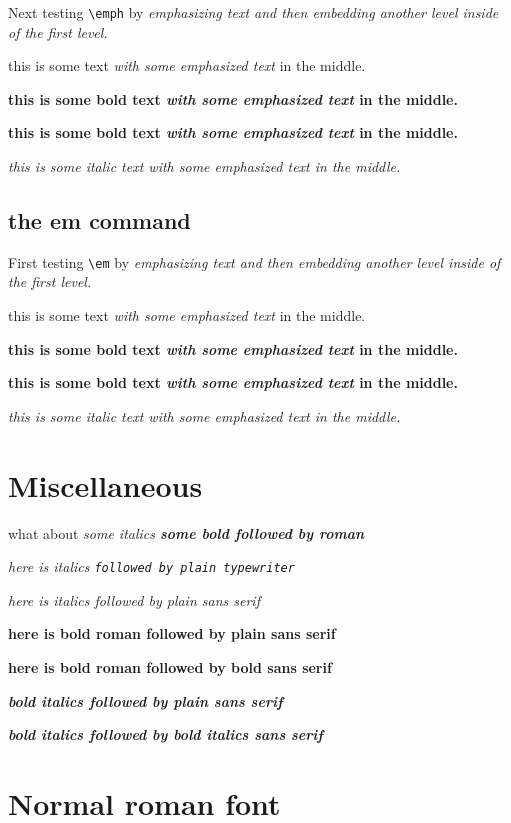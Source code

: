 \documentclass{article}
\begin{document}
Next testing \verb#\emph# by \emph{emphasizing text and then \emph{embedding another
level inside} of the first level.}

this is some text \emph{with some emphasized text} in the middle.

{\bf this is some bold text \emph{with some emphasized text} in the middle.}

\textbf{this is some bold text \emph{with some emphasized text} in the middle.}

\textit{this is some italic text \emph{with some emphasized text} in the middle.}

\subsection{the em command}

First testing \verb#\em# by {\em emphasizing text and then {\em embedding another
level inside} of the first level.}

this is some text {\em with some emphasized text} in the middle.

{\bf this is some bold text {\em with some emphasized text} in the middle.}

\textbf{this is some bold text {\em with some emphasized text} in the middle.}

\textit{this is some italic text {\em with some emphasized text} in the middle.}

\section{Miscellaneous}
what about \it some italics \bf some bold \rm followed by roman

{\it here is italics \tt followed by plain typewriter}

{\it here is italics \sf followed by plain sans serif}

\textbf{here is bold roman \sf followed by plain sans serif}

{\bf here is bold roman \textsf{followed by bold sans serif}}

\textbf{\textit{bold italics \sf followed by plain sans serif}}

\textbf{\textit{bold italics \textsf{followed by bold italics sans serif}}}

\section{Normal roman font}
\end{document}
